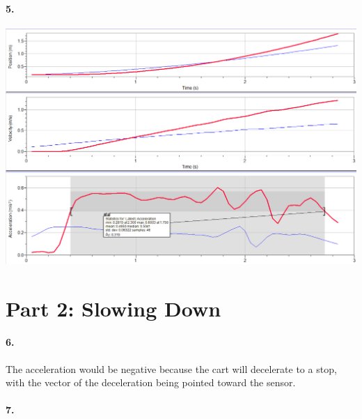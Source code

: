     \paragraph*{5.}

    \begin{mdframed}
        \centering\includegraphics[width=\textwidth]{image12}
    \end{mdframed}

    \pagebreak

    \section*{Part 2: Slowing Down}

    \paragraph*{6.}

    \begin{mdframed}
        The acceleration would be negative because the cart will decelerate to a stop, with the vector of the deceleration being pointed toward the sensor.
    \end{mdframed}

    \paragraph*{7.}

